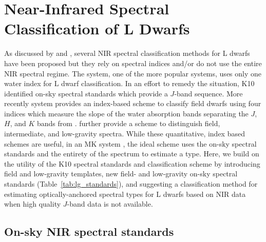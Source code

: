\documentclass[12pt,preprint]{aastex}
\begin{document}


\clearpage
\section{Near-Infrared Spectral Classification of L Dwarfs}
\label{sec:classification}

As discussed by \citet[\S~3.2]{Kirkpatrick05} and \citet[hereafter K10]{Kirkpatrick10}, several NIR spectral classification methods for L dwarfs have been proposed but they rely on spectral indices and/or do not use the entire NIR spectral regime. The \citet{Geballe02} system, one of the more popular systems, uses only one water index for L dwarf classification. In an effort to remedy the situation, K10 identified on-sky spectral standards which provide a $J$-band sequence. 
More recently \citet{Allers:2013hk} system provides an index-based scheme to classify field dwarfs using four indices which measure the slope of the water absorption bands separating the $J$, $H$, and $K$ bands from \cite{Allers07,McLean03,Slesnick04}. 
\citet{Allers:2013hk}  further provide a scheme to distinguish field, intermediate, and low-gravity spectra. 
While these quantitative, index based schemes are useful, in an MK system \citep{Morgan:1984wy}, the ideal scheme uses the on-sky spectral standards and the entirety of the spectrum to estimate a type. 
Here, we build on the utility of the K10 spectral standards and classification scheme by introducing field and low-gravity templates, new field- and low-gravity on-sky spectral standards (Table~\ref{tab:lg_standards}), and suggesting a classification method for estimating optically-anchored spectral types for L dwarfs based on NIR data when high quality $J$-band data is not available.

\subsection{On-sky NIR spectral standards}
\end{document}
